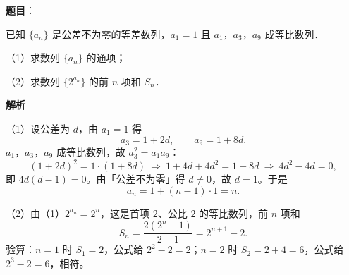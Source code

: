 \begin{answer}

\textbf{题目}：

已知 $\{a_n\}$ 是公差不为零的等差数列，$a_1=1$ 且 $a_1$，$a_3$，$a_9$ 成等比数列．

（1）求数列 $\{a_n\}$ 的通项；

（2）求数列 $\{2^{a_n}\}$ 的前 $n$ 项和 $S_n$．

\textbf{解析}

（1）设公差为 $d$，由 $a_1=1$ 得
\nopagebreak[4]
\[a_3=1+2d,\qquad a_9=1+8d.\]
$a_1$，$a_3$，$a_9$ 成等比数列，故 $a_3^2=a_1a_9$：
\nopagebreak[4]
\[(1+2d)^2=1\cdot(1+8d)\ \Longrightarrow\ 1+4d+4d^2=1+8d\ \Longrightarrow\ 4d^2-4d=0,\]
即 $4d(d-1)=0$。由「公差不为零」得 $d\ne 0$，故 $d=1$。于是
\nopagebreak[4]
\[a_n=1+(n-1)\cdot 1=n.\]

（2）由（1）$2^{a_n}=2^n$，这是首项 $2$、公比 $2$ 的等比数列，前 $n$ 项和
\nopagebreak[4]
\[S_n=\frac{2(2^n-1)}{2-1}=2^{n+1}-2.\]
验算：$n=1$ 时 $S_1=2$，公式给 $2^2-2=2$；$n=2$ 时 $S_2=2+4=6$，公式给 $2^3-2=6$，相符。


\end{answer}
